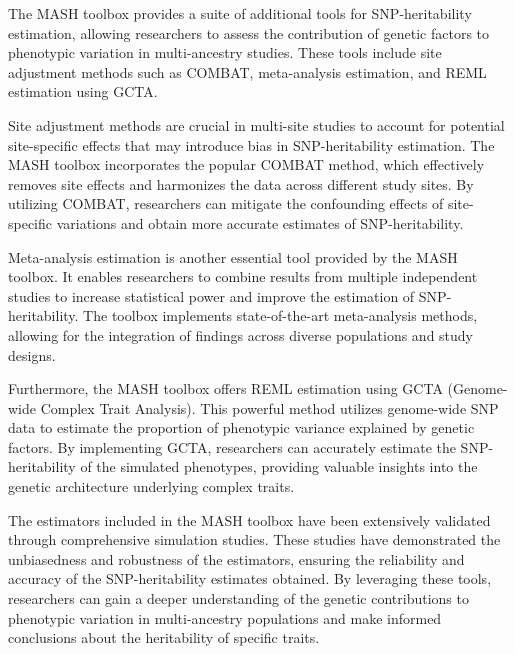 \documentclass[sn-nature]{sn-jnl}%
\begin{document}

The MASH toolbox provides a suite of additional tools for SNP-heritability estimation, allowing researchers to assess the contribution of genetic factors to phenotypic variation in multi-ancestry studies. These tools include site adjustment methods such as COMBAT, meta-analysis estimation, and REML estimation using GCTA.

Site adjustment methods are crucial in multi-site studies to account for potential site-specific effects that may introduce bias in SNP-heritability estimation. The MASH toolbox incorporates the popular COMBAT method, which effectively removes site effects and harmonizes the data across different study sites. By utilizing COMBAT, researchers can mitigate the confounding effects of site-specific variations and obtain more accurate estimates of SNP-heritability.

Meta-analysis estimation is another essential tool provided by the MASH toolbox. It enables researchers to combine results from multiple independent studies to increase statistical power and improve the estimation of SNP-heritability. The toolbox implements state-of-the-art meta-analysis methods, allowing for the integration of findings across diverse populations and study designs.

Furthermore, the MASH toolbox offers REML estimation using GCTA (Genome-wide Complex Trait Analysis). This powerful method utilizes genome-wide SNP data to estimate the proportion of phenotypic variance explained by genetic factors. By implementing GCTA, researchers can accurately estimate the SNP-heritability of the simulated phenotypes, providing valuable insights into the genetic architecture underlying complex traits.

The estimators included in the MASH toolbox have been extensively validated through comprehensive simulation studies. These studies have demonstrated the unbiasedness and robustness of the estimators, ensuring the reliability and accuracy of the SNP-heritability estimates obtained. By leveraging these tools, researchers can gain a deeper understanding of the genetic contributions to phenotypic variation in multi-ancestry populations and make informed conclusions about the heritability of specific traits.
\end{document}

